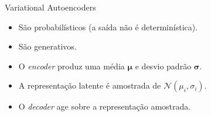 \documentclass[dvipsnames]{beamer}
\begin{document}
\begin{frame}{Variational Autoencoders}
	\begin{itemize}
		\item São probabilísticos (a saída não é determinística).
		\item São generativos.
		\item O \emph{encoder} produz uma média $\boldsymbol{\mu}$ e desvio padrão $\boldsymbol{\sigma}$.
		\item A representação latente é amostrada de $\mathcal{N}(\mu_i, \sigma_i)$.
		\item O \emph{decoder} age sobre a representação amostrada.
	\end{itemize}
\end{frame}
\end{document}
